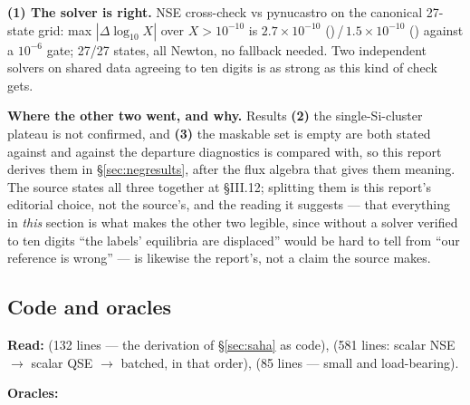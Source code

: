 \begin{result}
\textbf{(1) The solver is right.} NSE cross-check vs pynucastro on the canonical
27-state grid: max $|\Delta\log_{10}X|$ over $X > 10^{-10}$ is
\textbf{$2.7\times10^{-10}$} ()\,/\,\textbf{$1.5\times10^{-10}$}
() against a $10^{-6}$ gate; 27/27 states, all Newton, no fallback
needed.  Two independent solvers on shared data agreeing
to ten digits is as strong as this kind of check gets.
\end{result}

\begin{aside}
\textbf{Where the other two went, and why.} Results \textbf{(2)} the
single-Si-cluster plateau is not confirmed, and \textbf{(3)} the maskable set is
empty are both stated against \kap{} and against the departure diagnostics
\kap{} is compared with, so this report derives them in
\S\ref{sec:negresults}, after the flux algebra that gives them meaning. The
source states all three together at \S III.12; splitting them is this report's
editorial choice, not the source's, and the reading it suggests --- that
everything in \emph{this} section is what makes the other two legible, since
without a solver verified to ten digits ``the labels' equilibria are displaced''
would be hard to tell from ``our reference is wrong'' --- is likewise the
report's, not a claim the source makes.
\end{aside}

\subsection{Code and oracles}
\label{sec:codes9}

\textbf{Read:}  (132 lines --- the derivation of
\S\ref{sec:saha} as code),  (581 lines: scalar NSE $\to$
scalar QSE $\to$ batched, in that order),  (85 lines
--- small and load-bearing).

\textbf{Oracles:}

